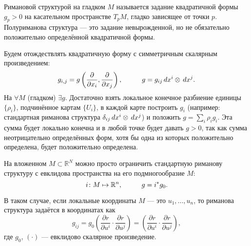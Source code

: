 \begin{to_def}
	Римановой структурой на гладком $M$ называется задание квадратичной формы $g_p >0$ на касательном пространстве $T_p M$, гладко зависящее от точки $p$. Полуриманова структура --- это задание невырожденной, но не обязательно положительно определённой квадратичной формы.
\end{to_def}

Будем отождествлять квадратичную форму с симметричным скалярным произведением:
\begin{equation*}
	g_{i,j} = g \left(\frac{\partial}{\partial x_i}, \frac{\partial}{\partial x_j}\right),
	\hspace*{1 cm}
	g = g_{i j} \, d x^i \otimes \, d x^j.
\end{equation*}
На $\forall M$ (гладком) $\exists g$. Достаточно взять локальное конечное разбиение единицы $\{\rho_i\}$, подчинённое картам $\{U_i\}$, в каждой карте построить $g_i$ (например: стандартная риманова структура $\delta_{i j} \, d x^i \otimes \, d x^j $) и положить $g = \sum_i \rho_i g_i$.
Эта сумма будет локально конечна и в любой точке будет давать $g>0$, так как сумма неотрицательно определённых форм, хотя бы одна из которых положительно определена, будет положительно определена.

На вложенном $M \subset \mathbb{R}^N$ можно просто ограничить стандартную риманову структуру с евклидова пространства на его подмногообразие $M$:
\begin{equation*}
	 i\colon M \mapsto \mathbb{R}^n, \hspace*{1 cm}  
	 g = i^* g_0.
\end{equation*}

В таком случае, если локальные координаты $M$ --- это $u_{1}, \ldots, u_n $, то риманова структура задаётся в координатах как
\begin{equation}
	g_{i j} = g_0\left(\frac{\partial r}{\partial u^i} \cdot \frac{\partial r}{\partial u^j}\right) = \left(\frac{\partial r}{\partial u^i} \cdot \frac{\partial r}{\partial u^j}\right),	
\end{equation}
где $g_{0}$, $(\cdot)$ --- евклидово скалярное произведение.
